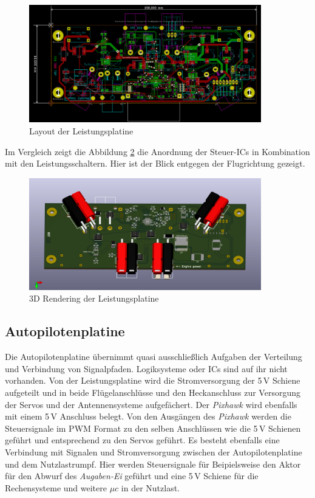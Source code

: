 \begin{figure}[H]
\centering
\includegraphics[width=0.9\textwidth]{bilder/Centerbox/Centerbox-Front-Power_AUVSI_2016_rev-01_layout.png} 
\caption{Layout der Leistungsplatine} 
\label{fig:Layout der Leistungsplatine}
\end{figure}

 Im Vergleich zeigt die Abbildung \ref{fig:3D Rendering der Leistungsplatinen Unterseite} die Anordnung der Steuer-ICs in Kombination mit den Leistungsschaltern. Hier ist der Blick entgegen der Flugrichtung gezeigt. 

\begin{figure}[H]
\centering
\includegraphics[width=0.9\textwidth]{bilder/Centerbox/Centerbox-Front-Power_AUVSI_2016_rev-01-3D.png} 
\caption{3D Rendering der Leistungsplatine} 
\label{fig:3D Rendering der Leistungsplatinen Unterseite}
\end{figure}

\subsection{Autopilotenplatine}

Die Autopilotenplatine übernimmt quasi ausschließlich Aufgaben der Verteilung und Verbindung von Signalpfaden. Logiksysteme oder ICs sind auf ihr nicht vorhanden. Von der Leistungsplatine wird die Stromversorgung der 5\,V Schiene aufgeteilt und in beide Flügelanschlüsse und den Heckanschluss zur Versorgung der Servos und der Antennensysteme aufgefächert. Der \textit{Pixhawk} wird ebenfalls mit einem 5\,V Anschluss belegt. 
Von den Ausgängen des \textit{Pixhawk} werden die Steuersignale im PWM Format zu den selben Anschlüssen wie die 5\,V Schienen geführt und entsprechend zu den Servos geführt.
Es besteht ebenfalls eine Verbindung mit Signalen und Stromversorgung zwischen der Autopilotenplatine und dem Nutzlastrumpf. Hier werden Steuersignale für Beipielsweise den Aktor für den Abwurf des \textit{Augaben-Ei} geführt und eine 5\,V Schiene für die Rechensysteme und weitere $\mu c $ in der Nutzlast.

